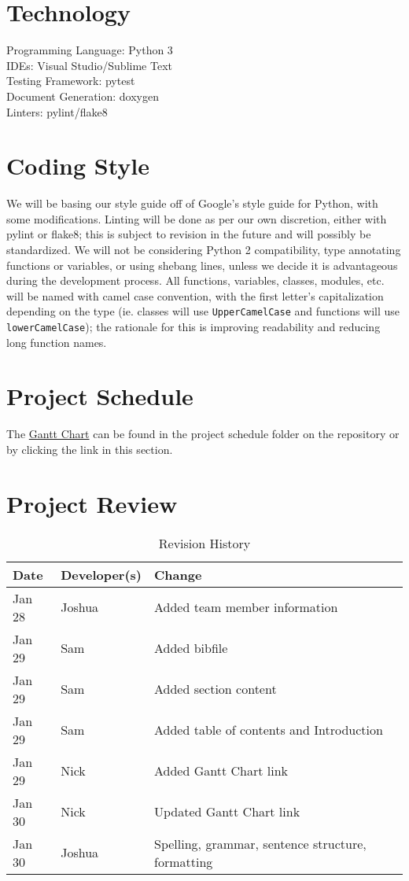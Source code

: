 \documentclass{article}
\begin{document}
\section{Technology}
Programming Language: Python 3 \\
IDEs: Visual Studio/Sublime Text \\
Testing Framework: pytest \\
Document Generation: doxygen \\
Linters: pylint/flake8

\section{Coding Style}
We will be basing our style guide off of Google’s style guide for Python, with 
some modifications. Linting will be done as per our own discretion, either with 
pylint or flake8; this is subject to revision in the future and will possibly be 
standardized. We will not be considering Python 2 compatibility, type annotating 
functions or variables, or using shebang lines, unless we decide it is 
advantageous during the development process. All functions, variables, classes, 
modules, etc. will be named with camel case convention, with the first letter’s 
capitalization depending on the type (ie. classes will use 
\texttt{UpperCamelCase} and functions will use \texttt{lowerCamelCase}); the 
rationale for this is improving readability and reducing long function names.

\section{Project Schedule}
The \href{https://gitlab.cas.mcmaster.ca/guinnesj/google-images-downloader/blob/master/ProjectSchedule/Gantt-Chart.pdf}{Gantt Chart} can be found in the project schedule folder on the repository or by clicking the link in this section.

\section{Project Review}

\printbibliography{}

\begin{table}[h]
\caption{Revision History} \label{TblRevisionHistory}
\begin{tabularx}{\textwidth}{llX}
\toprule
\textbf{Date} & \textbf{Developer(s)} & \textbf{Change}\\
\midrule
Jan 28 & Joshua & Added team member information\\
Jan 29 & Sam & Added bibfile\\
Jan 29 & Sam & Added section content\\
Jan 29 & Sam & Added table of contents and Introduction\\
Jan 29 & Nick & Added Gantt Chart link\\
Jan 30 & Nick & Updated Gantt Chart link\\
Jan 30 & Joshua & Spelling, grammar, sentence structure, formatting \\
\bottomrule
\end{tabularx}
\end{table}
\end{document}
